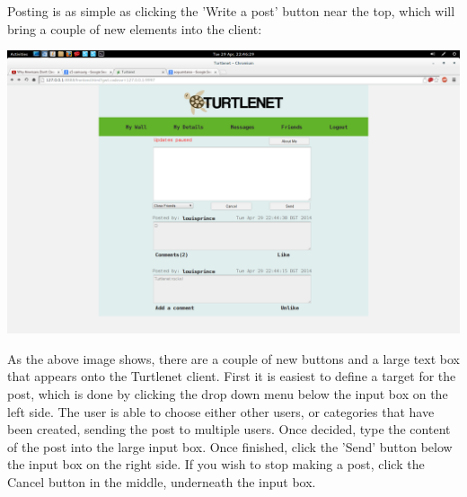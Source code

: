 Posting is as simple as clicking the 'Write a post' button near the top, which
will bring a couple of new elements into the client:

\includegraphics[scale=0.2]{../Screenshots/Screenshot from 2014-04-29 22-46-29}

As the above image shows, there are a couple of new buttons and a large text box
that appears onto the Turtlenet client.  First it is easiest to define a target
for the post, which is done by clicking the drop down menu below the input box
on the left side.  The user is able to choose either other users, or categories
that have been created, sending the post to multiple users.  Once decided, type
the content of the post into the large input box.  Once finished, click the
'Send' button below the input box on the right side.  If you wish to stop
making a post, click the Cancel button in the middle, underneath the input box.
